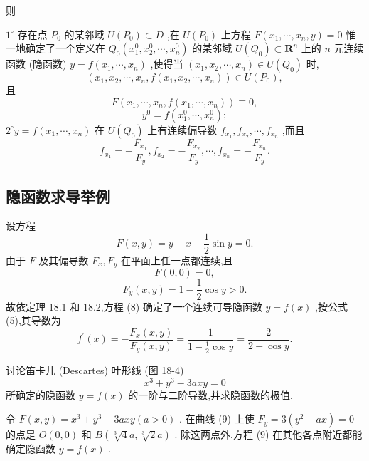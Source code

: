 则

\({1}^{ \circ  }\) 存在点 \({P}_{0}\) 的某邻域 \(U\left( {P}_{0}\right)  \subset  D\) ,在 \(U\left( {P}_{0}\right)\) 上方程 \(F\left( {{x}_{1},\cdots ,{x}_{n},y}\right)  = 0\) 惟一地确定了一个定义在 \({Q}_{0}\left( {{x}_{1}^{0},{x}_{2}^{0},\cdots ,{x}_{n}^{0}}\right)\) 的某邻域 \(U\left( {Q}_{0}\right)  \subset  {\mathbf{R}}^{n}\) 上的 \(n\) 元连续函数 (隐函数) \(y = f\left( {{x}_{1},\cdots ,{x}_{n}}\right)\) ,使得当 \(\left( {{x}_{1},{x}_{2},\cdots ,{x}_{n}}\right)  \in  U\left( {Q}_{0}\right)\) 时,
\[
\left( {{x}_{1},{x}_{2},\cdots ,{x}_{n},f\left( {{x}_{1},{x}_{2},\cdots ,{x}_{n}}\right) }\right)  \in  U\left( {P}_{0}\right) ,
\]
且
\[
F\left( {{x}_{1},\cdots ,{x}_{n},f\left( {{x}_{1},\cdots ,{x}_{n}}\right) }\right)  \equiv  0,
\]
\[
{y}^{0} = f\left( {{x}_{1}^{0},\cdots ,{x}_{n}^{0}}\right) ;
\]
\({2}^{ \circ  }y = f\left( {{x}_{1},\cdots ,{x}_{n}}\right)\) 在 \(U\left( {Q}_{0}\right)\) 上有连续偏导数 \({f}_{{x}_{1}},{f}_{{x}_{2}},\cdots ,{f}_{{x}_{n}}\) ,而且
\[
{f}_{{x}_{1}} =  - \frac{{F}_{{x}_{1}}}{{F}_{y}},{f}_{{x}_{2}} =  - \frac{{F}_{{x}_{2}}}{{F}_{y}},\cdots ,{f}_{{x}_{n}} =  - \frac{{F}_{{x}_{n}}}{{F}_{y}}.
\]
\subsection{隐函数求导举例}

\begin{example}

\end{example}
设方程
\[
F\left( {x,y}\right)  = y - x - \frac{1}{2}\sin y = 0. \tag{8}
\]
由于 \(F\) 及其偏导数 \({F}_{x},{F}_{y}\) 在平面上任一点都连续,且
\[
F\left( {0,0}\right)  = 0,
\]
\[
{F}_{y}\left( {x,y}\right)  = 1 - \frac{1}{2}\cos y > 0.
\]
故依定理 18.1 和 18.2,方程 (8) 确定了一个连续可导隐函数 \(y = f\left( x\right)\) ,按公式 (5),其导数为
\[
{f}^{\prime }\left( x\right)  =  - \frac{{F}_{x}\left( {x,y}\right) }{{F}_{y}\left( {x,y}\right) } = \frac{1}{1 - \frac{1}{2}\cos y} = \frac{2}{2 - \cos y}. \tag{0}
\]
\begin{example}

\end{example}
讨论笛卡儿 (Descartes) 叶形线 (图 18-4)
\[
{x}^{3} + {y}^{3} - {3axy} = 0 \tag{9}
\]
所确定的隐函数 \(y = f\left( x\right)\) 的一阶与二阶导数,并求隐函数的极值.

\begin{solution}

\end{solution}
令 \(F\left( {x,y}\right)  = {x}^{3} + {y}^{3} - {3axy}\left( {a > 0}\right)\) . 在曲线 (9) 上使 \({F}_{y} = 3\left( {{y}^{2} - {ax}}\right)  = 0\) 的点是 \(O\left( {0,0}\right)\) 和 \(B\left( {\sqrt[3]{4}a,\sqrt[3]{2}a}\right)\) . 除这两点外,方程 (9) 在其他各点附近都能确定隐函数 \(y = f\left( x\right)\) .

